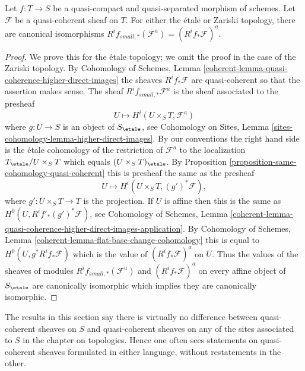 \begin{lemma}
\label{lemma-higher-direct-images-small-etale}
Let $f : T \to S$ be a quasi-compact and quasi-separated morphism of schemes.
Let $\mathcal{F}$ be a quasi-coherent sheaf on $T$. For either the \'etale
or Zariski topology, there are canonical isomorphisms
$R^if_{small, *}(\mathcal{F}^a) = (R^if_*\mathcal{F})^a$.
\end{lemma}

\begin{proof}
We prove this for the \'etale topology; we omit the proof in the case
of the Zariski topology. By Cohomology of Schemes, Lemma
\ref{coherent-lemma-quasi-coherence-higher-direct-images}
the sheaves $R^if_*\mathcal{F}$ are quasi-coherent so that the assertion
makes sense. The sheaf $R^if_{small, *}\mathcal{F}^a$ is the sheaf associated
to the presheaf
$$
U \longmapsto H^i(U \times_S T, \mathcal{F}^a)
$$
where $g : U \to S$ is an object of $S_\etale$, see
Cohomology on Sites, Lemma \ref{sites-cohomology-lemma-higher-direct-images}.
By our conventions the right hand side is the \'etale
cohomology of the restriction of $\mathcal{F}^a$ to the localization
$T_\etale/U \times_S T$ which equals
$(U \times_S T)_\etale$. By
Proposition \ref{proposition-same-cohomology-quasi-coherent}
this is presheaf the same as the presheaf
$$
U \longmapsto
H^i(U \times_S T, (g')^*\mathcal{F}),
$$
where $g' : U \times_S T \to T$ is the projection. If $U$ is affine
then this is the same as $H^0(U, R^if'_*(g')^*\mathcal{F})$, see
Cohomology of Schemes, Lemma
\ref{coherent-lemma-quasi-coherence-higher-direct-images-application}.
By
Cohomology of Schemes, Lemma \ref{coherent-lemma-flat-base-change-cohomology}
this is equal to $H^0(U, g^*R^if_*\mathcal{F})$ which is the value
of $(R^if_*\mathcal{F})^a$ on $U$.
Thus the values of the sheaves of modules
$R^if_{small, *}(\mathcal{F}^a)$ and $(R^if_*\mathcal{F})^a$
on every affine object of $S_\etale$ are canonically isomorphic
which implies they are canonically isomorphic.
\end{proof}

\noindent
The results in this section say there is virtually no difference between
quasi-coherent sheaves on $S$ and quasi-coherent sheaves on any of the
sites associated to $S$ in the chapter on topologies. Hence one often
sees statements on quasi-coherent sheaves formulated in either language,
without restatements in the other.







